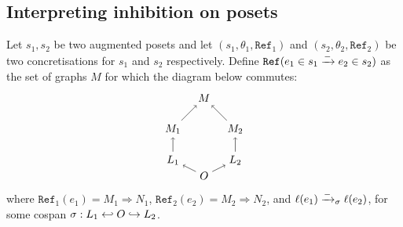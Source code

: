 \subsection{Interpreting inhibition on posets}
\label{sec:inhibition}

\begin{definition}
  \label{def:ref_neg_infl}
  Let $s_1,s_2$ be two augmented posets and let $(s_1,\theta_1,\mathtt{Ref}_1)$ and $(s_2,\theta_2,\mathtt{Ref}_2)$ be two concretisations for $s_1$ and $s_2$ respectively.
  Define $\mathtt{Ref}(e_1\in s_1\mathrel{\xrightarrow{-}} e_2\in s_2)$ as the set of graphs $M$ for which the diagram below commutes:
  \[
  \begin{tikzpicture} %
    \node (o) at (0,-0.5) {\(O\)};
    \node (n) at (0,2) {\(M\)};
    \node (l1) at (-1,0) {\(L_1\)};
    \node (l2) at (1,0) {\(L_2\)};
    \node (n1) at (-1,1) {\(M_1\)};
    \node (n2) at (1,1) {\(M_2\)};
    \draw [->] (l1) -- (n1);
    \draw [->] (l2) -- (n2);
    \draw [->] (o) -- (l1);
    \draw [->] (o) -- (l2);
    \draw [->] (n1) -- (n);
    \draw [->] (n2) -- (n);
  \end{tikzpicture}
  \]
  where $\mathtt{Ref}_1(e_1) = M_1\Rightarrow N_1$, $\mathtt{Ref}_2(e_2) = M_2\Rightarrow N_2$, and $\ell(e_1)\mathrel{\xrightarrow{-}}_{\sigma}\ell(e_2)$, for some cospan $\sigma:L_1\hookleftarrow O\hookrightarrow L_2$.
\end{definition}
